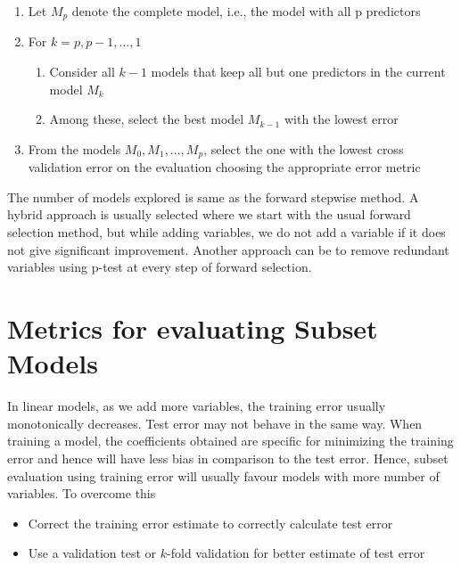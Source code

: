 \documentclass[../statistical_learning_notes.tex]{subfiles}
\begin{document}
    \begin{enumerate}
        \item Let $M_{p}$ denote the complete model, i.e., the model with all p predictors
        \item For $k = p, p-1, \ldots, 1$
        \begin{enumerate}
            \item Consider all $k-1$ models that keep all but one predictors in the current model $M_{k}$
            \item Among these, select the best model $M_{k-1}$ with the lowest error
        \end{enumerate}
        \item From the models $M_{0}, M_{1}, \ldots, M_{p}$, select the one with the lowest cross validation error on the evaluation choosing the appropriate error metric 
    \end{enumerate}

    The number of models explored is same as the forward stepwise method.\newline
    A hybrid approach is usually selected where we start with the usual forward selection method, but while adding variables, we do not add a variable if it does not give significant improvement. Another approach can be to remove redundant variables using p-test at every step of forward selection.

    
    \section{Metrics for evaluating Subset Models}
    In linear models, as we add more variables, the training error usually monotonically decreases. Test error may not behave in the same way. When training a model, the coefficients obtained are specific for minimizing the training error and hence will have less bias in comparison to the test error. \newline
    Hence, subset evaluation using training error will usually favour models with more number of variables. To overcome this
    \begin{itemize}
        \item Correct the training error estimate to correctly calculate test error
        \item Use a validation test or $k$-fold validation for better estimate of test error
    \end{itemize}
    
\end{document}
